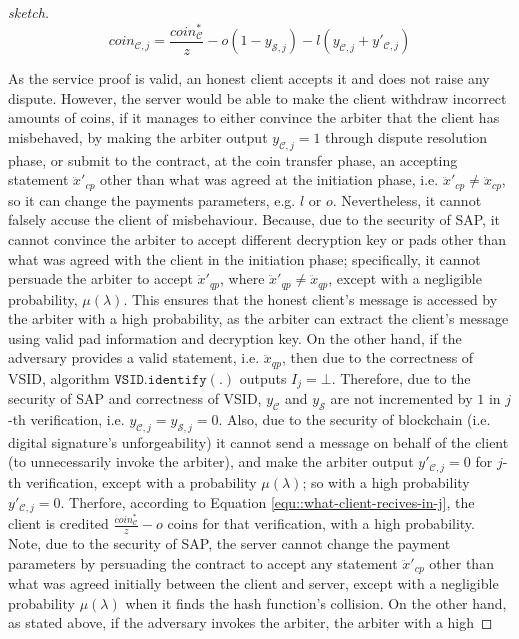 \begin{proof}[sketch]
  \begin{equation}\label{equ::what-client-recives-in-j}
   coin_{\scriptscriptstyle\mathcal{C},j}=\frac{coin^{\scriptscriptstyle *}_{\scriptscriptstyle\mathcal C}}{z}-o(1-y_{\scriptscriptstyle\mathcal {S},j})-l(y_{\scriptscriptstyle\mathcal {C},j}+y'_{\scriptscriptstyle\mathcal {C},j})
     \end{equation}

    
As the service proof is valid, an honest client accepts it and does not raise any dispute. However, the server  would be able to make the client  withdraw incorrect amounts of coins, if it manages to either convince the arbiter that the client has misbehaved, by making the arbiter output  $y_{\scriptscriptstyle\mathcal {C},j}=1$ through dispute resolution phase, or submit to the contract, at the coin transfer phase,  an accepting  statement $\ddot{x}'_{\scriptscriptstyle cp}$ other than what was agreed at the initiation phase, i.e. $\ddot{x}'_{\scriptscriptstyle cp}\neq\ddot{x}_{\scriptscriptstyle cp}$, so it can change the payments parameters, e.g. $l$ or $o$. Nevertheless, it cannot falsely accuse the client of misbehaviour. Because,  due to the security of SAP, it cannot  convince the arbiter to accept different decryption key or pads other than what was agreed with the client in the initiation phase; specifically, it cannot persuade the arbiter to accept  $\ddot{x}'_{\scriptscriptstyle qp}$, where $\ddot{x}'_{\scriptscriptstyle qp}\neq \ddot{x}_{\scriptscriptstyle qp}$, except with a negligible probability, $\mu(\lambda)$. This ensures that the honest client's message is accessed by  the arbiter with a high probability, as the arbiter can extract the client's message using valid pad information and decryption key.  On the other hand, if the adversary provides a valid statement, i.e. $\ddot{x}_{\scriptscriptstyle qp}$, then due to the correctness of VSID, algorithm $\mathtt{VSID.identify}(.)$ outputs $I_{\scriptscriptstyle j}=\bot$. Therefore, due to the security of SAP and correctness of VSID,   $y_{\scriptscriptstyle\mathcal {C}}$ and $y_{\scriptscriptstyle\mathcal {S}}$ are not incremented by $1$  in $j$-th verification, i.e. $y_{\scriptscriptstyle\mathcal{C},j}=y_{\scriptscriptstyle\mathcal{S},j}=0$. Also, due to the security of blockchain (i.e. digital signature's  unforgeability) it cannot send a message on behalf of the client (to unnecessarily invoke the arbiter), and make  the arbiter output $y'_{\scriptscriptstyle\mathcal {C},j}=0$ for $j$-th verification, except with a probability $\mu(\lambda)$; so with a high probability $y'_{\scriptscriptstyle\mathcal {C},j}=0$. Therfore, according to Equation \ref{equ::what-client-recives-in-j}, the client is credited $\frac{coin_{\scriptscriptstyle\mathcal C}^{\scriptscriptstyle*}}{z}-o$ coins for that verification, with a high probability. Note,  due to the security of SAP, the server cannot change the payment parameters by persuading the contract to accept any statement $\ddot{x}'_{\scriptscriptstyle cp}$ other than what was agreed initially between the client and server, except with a negligible probability $\mu(\lambda)$ when it finds the hash function's collision. On the other hand, as stated above, if the adversary invokes the arbiter, the arbiter with a high 
\end{proof}
